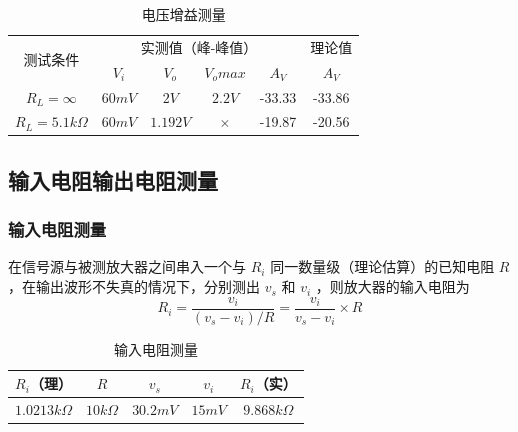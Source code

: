 \documentclass{../source/Experiment}
\begin{document}
\begin{enumerate}
                \begin{table}[h]
                    \centering
                    \begin{tabular}{|c|c|c|c|c|c|}
                    \hline
                    \multirow{2}{*}{测试条件} & \multicolumn{4}{c|}{实测值（峰-峰值）} & 理论值 \\ \cline{2-6} 
                                        &   $V_i$  &  $V_o$   &  $V_omax$   &  $A_V$   & $A_V$ \\ \hline
                                        $R_L = \infty$  &  $60mV$   &  $2V$   &  $2.2V$   &  -33.33   & -33.86 \\ \hline
                                        $R_L = 5.1k \Omega $  &  $60mV$   &  $1.192V$   &  $\times$   &   -19.87  & -20.56 \\ \hline
                    \end{tabular}
                    \caption{电压增益测量}
                \end{table}
            \end{enumerate}
            \subsection{输入电阻输出电阻测量}
                \subsubsection{输入电阻测量}
                在信号源与被测放大器之间串入一个与 $R_i$ 同一数量级（理论估算）的已知电阻 $R$ ，在输出波形不失真的情况下，分别测出 $v_s$ 和 $v_i$ ，则放大器的输入电阻为
                $$R_i = \frac{v_i}{(v_s - v_i)/R} = \frac{v_i}{v_s - v_i} \times R $$
                \begin{table}[h]
                    \centering
                    \begin{tabular}{|c|c|c|c|c|}
                    \hline
                    $R_i$（理）        & $R$   & $v_s$    & $v_i$  & $R_i$（实） \\ \hline
                    $1.0213k\Omega$ & $10k\Omega$ & $30.2mV$ & $15mV$ & $9.868k\Omega$ \\ \hline
                    \end{tabular}
                    \caption{输入电阻测量}
                \end{table}
\end{document}

